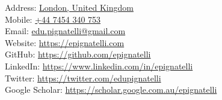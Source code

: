 \newcommand{\fakesection}[1]{%
  \par\refstepcounter{section}%
  \sectionmark{#1}%
  \addcontentsline{toc}{section}{\protect\numberline{\thesection}#1}%
}

Address: \href{https://goo.gl/maps/x1G2mCkBJvDdVE1t9}{London, United Kingdom} \\
Mobile: \href{tel:07454340753}{+44 7454 340 753} \\
Email:  \href{mailto:edu.pignatelli@gmail.com}{edu.pignatelli@gmail.com} \\
Website: \href{https://epignatelli.com}{https://epignatelli.com} \\
GitHub: \href{https://github.com/epignatelli}{https://github.com/epignatelli} \\
LinkedIn: \href{https://www.linkedin.com/in/epignatelli}{https://www.linkedin.com/in/epignatelli} \\
Twitter: \href{https://twitter.com/edupignatelli}{https://twitter.com/edupignatelli} \\
Google Scholar: \href{https://scholar.google.com.au/citations?user=d-TVZ1YAAAAJ\&hl=en}{https://scholar.google.com.au/epignatelli}
